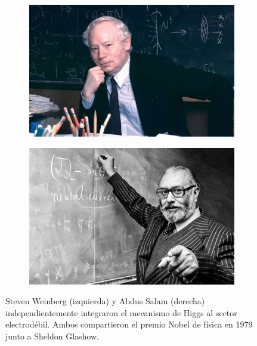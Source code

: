 \begin{figure}
\begin{subfigure}{0.5\textwidth}
	\includegraphics[scale=0.5]{images/weinberg.jpeg}
\end{subfigure}	
\begin{subfigure}{0.5\textwidth}
	\includegraphics[scale=0.5]{images/salam.jpeg}
\end{subfigure}	
\caption{Steven Weinberg (izquierda) y Abdus Salam (derecha) independientemente integraron el mecanismo de Higgs al sector electrod\'ebil. Ambos compartieron el premio Nobel de f\'isica en 1979 junto a Sheldon Glashow.}
\end{figure}

